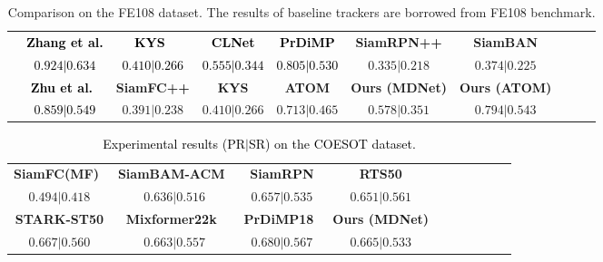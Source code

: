 \documentclass[journal]{IEEEtran}
\begin{document}
\begin{table*}[!htp]
\center
\scriptsize      
\caption{Comparison on the FE108 dataset. The results of baseline trackers are borrowed from FE108 benchmark.} \label{FE108Results} 
\begin{tabular}{cccccccccc} 	 
\hline \toprule [0.5 pt]  
&\textcolor{black}{\textbf{Zhang et al.} \cite{Zhang2021FE108}}  
&\textcolor{black}{\textbf{KYS}}~\cite{Goutam2020KYS} 
&\textcolor{black}{\textbf{CLNet} \cite{dong2020clnet}} 
&\textcolor{black}{\textbf{PrDiMP} \cite{danelljan2020PRDiMP}}  
&\textbf{SiamRPN++} \cite{li2018siamrpn++} 			
&\textbf{SiamBAN} \cite{chen2020siamban} 	 \\ 
&\textcolor{black}{$0.924|0.634$}       
&\textcolor{black}{$0.410|0.266$}       
&\textcolor{black}{$0.555|0.344$}        
&\textcolor{black}{$0.805|0.530$}       
&$0.335|0.218$  	
&$0.374|0.225$  	 \\ 
\hline 
&\textcolor{black}{\textbf{Zhu et al.}}~\cite{zhu2022GrapheventTrack} &\textbf{SiamFC++} \cite{xu2020siamfc++} 	  &\textbf{KYS} \cite{Goutam2020KYS}	  	&\textbf{ATOM} \cite{danelljan2019atom}	    &\textbf{Ours (MDNet)}  	&\textbf{Ours (ATOM)}	  \\
&\textcolor{black}{$0.859|0.549$}       &$0.391|0.238$ 		&$0.410|0.266$  		&$0.713|0.465$ 		&$0.578|0.351$   		&$0.794|0.543$ 					  		 \\
\hline \toprule [0.5 pt]
\end{tabular}
\end{table*} 






\begin{table}[!htp]
\center
\scriptsize      
\caption{\textcolor{black}{Experimental results (PR$|$SR) on the COESOT dataset.}} 
\label{COESOTResults} 
\begin{tabular}{cccccccccc} 	 
\hline \toprule [0.5 pt]  
\textbf{SiamFC(MF)}~\cite{bertinetto2016siamfc}  
&\textbf{SiamBAM-ACM}~\cite{han2021SiamBANACM}  
&\textbf{SiamRPN} \cite{li2018siamRPN}  
&\textbf{RTS50} \cite{paul2022RTS}  \\ 
$0.494|0.418$      
&$0.636|0.516$     
&$0.657|0.535$     
&$0.651|0.561$     \\  
\hline 
\textbf{STARK-ST50} \cite{yan2021stark} 	 
&\textbf{Mixformer22k}~\cite{cui2022mixformer}   
&\textbf{PrDiMP18}~\cite{danelljan2020PRDiMP}   
&\textbf{Ours (MDNet)} \\  
\hline 
$0.667|0.560$  
&$0.663|0.557$       
&$0.680|0.567$       
&$0.665|0.533$       	 \\ 
\hline \toprule [0.5 pt]
\end{tabular}
\end{table} 
\end{document}
